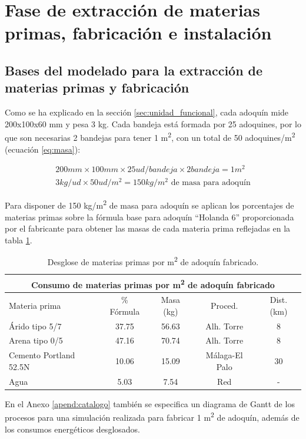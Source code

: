 \section{Fase de extracción de materias primas, fabricación e instalación}

\subsection{Bases del modelado para la extracción de materias primas y fabricación}
Como se ha explicado en la sección \ref{sec:unidad_funcional}, cada adoquín mide 200x100x60 \si{mm} y pesa 3 \si{kg}. Cada bandeja está formada por 25 adoquines, por lo que son necesarias 2 bandejas para tener 1 \si{m^2}, con un total de 50 adoquines/\si{m^2} (ecuación \ref{eq:masa}):

\begin{gather}
200 mm \times 100 mm \times 25 ud/bandeja \times 2 bandeja = 1 m^2\\
3 kg/ud \times 50 ud/m^2 = 150 kg/m^2 \text{ de masa para adoquín}\label{eq:masa}
\end{gather}

Para disponer de 150 \si{kg/m^2} de masa para adoquín se aplican los porcentajes de materias primas sobre la fórmula base para adoquín ``Holanda 6'' proporcionada por el fabricante para obtener las masas de cada materia prima reflejadas en la tabla \ref{desglosemateriasprimas}.

\begin{table}[!htb]
\centering
\begin{tabular}{lcccc}
\toprule
\multicolumn{5}{c}{Consumo de materias primas por \si{m^2} de adoquín fabricado}\\
\midrule
Materia prima & \% Fórmula & Masa (\si{kg}) & Proced. & Dist. (\si{km})\\
\midrule
Árido tipo 5/7 & 37.75 & 56.63 & Alh. Torre & 8\\
Arena tipo 0/5 & 47.16 & 70.74 & Alh. Torre & 8\\
Cemento Portland 52.5N & 10.06 & 15.09 & Málaga-El Palo & 30\\
Agua & 5.03 & 7.54 & Red & -\\
\bottomrule
\end{tabular}
\caption{Desglose de materias primas por \si{m^2} de adoquín fabricado.}
\label{desglosemateriasprimas}
\end{table}

En el Anexo \ref{apend:catalogo} también se especifica un diagrama de Gantt de los procesos para una simulación realizada para fabricar 1 \si{m^2} de adoquín, además de los consumos energéticos desglosados.

